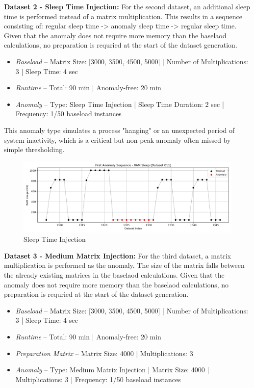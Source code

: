\documentclass[12pt,oneside]{article}
\begin{document}
\textbf{Dataset 2 - Sleep Time Injection:} For the second dataset, an additional sleep time is performed instead of a matrix multiplication. This results in a sequence consisting of: regular sleep time -> anomaly sleep time -> regular sleep time. Given that the anomaly does not require more memory than the baselaod calculations, no preparation is requried at the start of the dataset generation.
\begin{itemize}
    \item \textit{Baseload} -- Matrix Size: [3000, 3500, 4500, 5000] | Number of Multiplications: 3 | Sleep Time: 4 sec
    \item \textit{Runtime} -- Total: 90 min | Anomaly-free: 20 min 
    \item \textit{Anomaly} -- Type: Sleep Time Injection | Sleep Time Duration: 2 sec | Frequency: 1/50 baseload instances
\end{itemize}

This anomaly type simulates a process "hanging" or an unexpected period of system inactivity, which is a critical but non-peak anomaly often missed by simple thresholding.

\begin{figure}[H] %
    \centering %
    \includegraphics[width=\textwidth]{anomaly_sequence_11}
    \caption{Sleep Time Injection}
    \label{fig:anomaly_11} %
\end{figure}

\textbf{Dataset 3 - Medium Matrix Injection:} For the third dataset, a matrix multiplication is performed as the anomaly. The size of the matrix falls between the already existing matrices in the baselaod calculations. Given that the anomaly does not require more memory than the baselaod calculations, no preparation is requried at the start of the dataset generation.
\begin{itemize}
    \item \textit{Baseload} -- Matrix Size: [3000, 3500, 4500, 5000] | Number of Multiplications: 3 | Sleep Time: 4 sec
    \item \textit{Runtime} -- Total: 90 min | Anomaly-free: 20 min 
    \item \textit{Preparation Matrix} -- Matrix Size: 4000 | Multiplications: 3
    \item \textit{Anomaly} -- Type: Medium Matrix Injection | Matrix Size: 4000 | Multiplications: 3 | Frequency: 1/50 baseload instances
\end{itemize}
\end{document}
